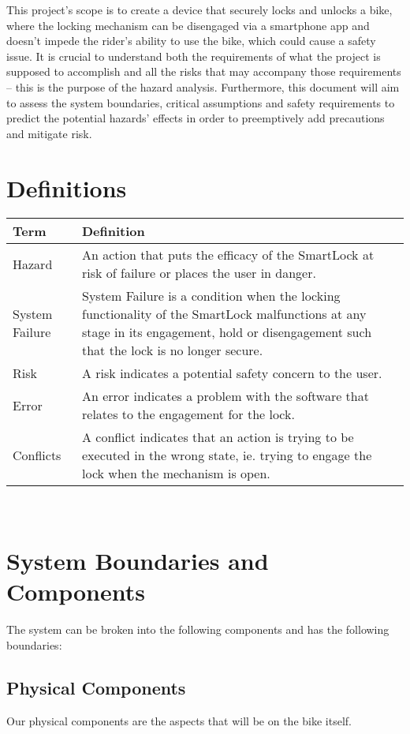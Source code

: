 \documentclass{article}
\begin{document}
This project's scope is to create a device that securely locks and unlocks a bike, where the locking mechanism can be disengaged via a smartphone app and doesn’t impede the rider's ability to use the bike, which could cause a safety issue.  It is crucial to understand both the requirements of what the project is supposed to accomplish and all the risks that may accompany those requirements – this is the purpose of the hazard analysis.  Furthermore, this document will aim to assess the system boundaries, critical assumptions and safety requirements to predict the potential hazards' effects in order to preemptively add precautions and mitigate risk. 


\section{Definitions}

\begin{minipage}{\textwidth}
\renewcommand*{\arraystretch}{1.5}
\begin{tabular}{| p{} | p{} |}
 \hline
 Term & Definition \\ 
 \hline
 Hazard & An action that puts the efficacy of the SmartLock at risk of failure or places the user in danger.\\ 
  \hline
 System Failure & System Failure is a condition when the locking functionality of the SmartLock malfunctions at any stage in its engagement, hold or disengagement such that the lock is no longer secure.\\ 
  \hline
 Risk & A risk indicates a potential safety concern to the user.\\ 
  \hline
 Error & An error indicates a problem with the software that relates to the engagement for the lock.\\ 
  \hline
 Conflicts & A conflict indicates that an action is trying to be executed in the wrong state, ie. trying to engage the lock when the mechanism is open.\\ 
 \hline
\end{tabular}
\end{minipage}\\

\section{System Boundaries and Components}
The system can be broken into the following components and has the following boundaries:
\subsection {Physical Components}
Our physical components are the aspects that will be on the bike itself.
\end{document}
